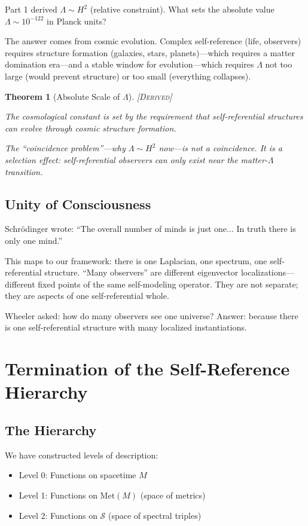 \documentclass[11pt,a4paper]{article}
\newtheorem{theorem}{Theorem}[section]
\theoremstyle{definition}
\theoremstyle{remark}
\begin{document}
Part 1 derived $\Lambda \sim H^2$ (relative constraint). What sets the absolute value $\Lambda \sim 10^{-122}$ in Planck units?

The answer comes from cosmic evolution. Complex self-reference (life, observers) requires structure formation (galaxies, stars, planets)---which requires a matter domination era---and a stable window for evolution---which requires $\Lambda$ not too large (would prevent structure) or too small (everything collapses).

\begin{theorem}[Absolute Scale of $\Lambda$]
\textsc{[Derived]}

The cosmological constant is set by the requirement that self-referential structures can evolve through cosmic structure formation.

The ``coincidence problem''---why $\Lambda \sim H^2$ now---is not a coincidence. It is a selection effect: self-referential observers can only exist near the matter-$\Lambda$ transition.
\end{theorem}

\subsection{Unity of Consciousness}

Schr\"odinger wrote: ``The overall number of minds is just one... In truth there is only one mind.''

This maps to our framework: there is one Laplacian, one spectrum, one self-referential structure. ``Many observers'' are different eigenvector localizations---different fixed points of the same self-modeling operator. They are not separate; they are aspects of one self-referential whole.

Wheeler asked: how do many observers see one universe? Answer: because there is one self-referential structure with many localized instantiations.

\section{Termination of the Self-Reference Hierarchy}

\subsection{The Hierarchy}

We have constructed levels of description:
\begin{itemize}
    \item Level 0: Functions on spacetime $M$
    \item Level 1: Functions on $\text{Met}(M)$ (space of metrics)
    \item Level 2: Functions on $\mathcal{S}$ (space of spectral triples)
\end{itemize}
\end{document}
